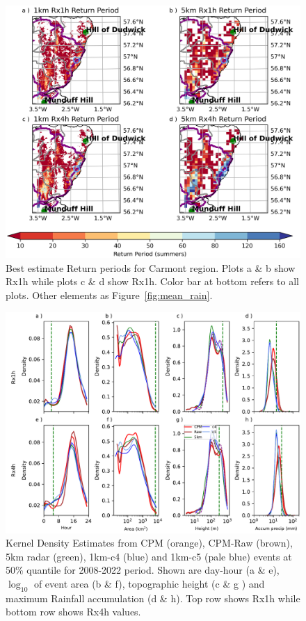 \documentclass[11pt,a4paper]{article}
\begin{document}
\begin{figure}
	\centering
	\includegraphics[width=\linewidth]{map_return_prds}
	\caption{Best estimate Return periods for Carmont region. Plots a \& b show Rx1h while plots c \& d show Rx1h. Color bar at bottom refers to all plots. Other elements as Figure~\ref{fig:mean_rain}. } 
	\label{fig:map_rtn_prd}
\end{figure}


\begin{figure}
	\centering
	\includegraphics[width=\linewidth]{kde_smooth_events}
	\caption{Kernel Density Estimates from  CPM (orange), CPM-Raw (brown), 5km radar (green), 1km-c4 (blue) and 1km-c5 (pale blue) events at 50\% quantile for 2008-2022 period. Shown are day-hour (a \& e),$\log_{10}$ of event area (b \& f),  topographic height (c \& g ) and maximum Rainfall accumulation (d \& h). Top row shows Rx1h while bottom row shows Rx4h values.}
\end{figure}
\end{document}
